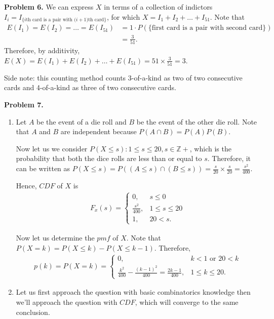 \documentclass{article}
\begin{document}
\textbf{Problem 6.}
We can express $X$ in terms of a collection of indictors $I_i = I_{\text{\{$i$th card is a pair with ($i+1$)th card\}}}$, for which $X=I_1 + I_2 + \dots + I_{51}$.
Note that 
\begin{align}
    E(I_1) = E(I_2) = \dots = E(I_{51}) & = 1 \cdot P(\text{\{first card is a pair with second card\}}) \\
    & = \frac{3}{51}.
\end{align}
Therefore, by additivity, $E(X)=E(I_1)+E(I_2)+ \dots +E(I_51)=51 \times \frac{3}{51}=3$.

Side note: this counting method counts 3-of-a-kind as two of two consecutive cards and 4-of-a-kind as three of two consecutive cards.
\bigbreak

\textbf{Problem 7.}
\begin{enumerate}[label={(\alph*)}]
    \item 
    Let $A$ be the event of a die roll and $B$ be the event of the other die roll. Note that $A$ and $B$ are independent because $P(A \cap B)=P(A)P(B)$.
    
    Now let us we consider $P(X \le s):1 \le s \le 20, s \in \mathbb{Z+}$, which is the probability that both the dice rolls are less than or equal to $s$. Therefore, it can be written as $P(X \le s)=P((A \le s) \cap (B \le s))=\frac{s}{20} \times \frac{s}{20}=\frac{s^2}{400}$.

    Hence, $CDF$ of $X$ is 
    \begin{align}
        F_x(s) = 
            \begin{cases}
                0, & s \le 0 \\
                \frac{s^2}{400}, & 1 \le s \le 20 \\
                1, & 20 < s.
            \end{cases}
    \end{align}

    Now let us determine the $pmf$ of $X$. 
    Note that $P(X=k)=P(X \le k)-P(X \le k-1)$.
    Therefore, 
    \begin{align}
        p(k)=P(X=k)=
        \begin{cases}
            0, & k < 1 \text{ or } 20 < k \\
            \frac{k^2}{400}-\frac{(k-1)^2}{400}=\frac{2k-1}{400}, & 1 \le k \le 20.
        \end{cases}
    \end{align}

    \item
    Let us first approach the question with basic combinatorics knowledge then we'll approach the question with $CDF$, which will converge to the same conclusion.
    

\end{enumerate}
\end{document}
